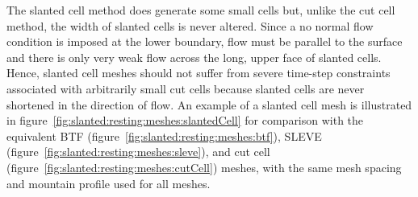 The slanted cell method does generate some small cells but, unlike the cut cell method, the width of slanted cells is never altered.
Since a no normal flow condition is imposed at the lower boundary, flow must be parallel to the surface and there is only very weak flow across the long, upper face of slanted cells.
Hence, slanted cell meshes should not suffer from severe time-step constraints associated with arbitrarily small cut cells because slanted cells are never shortened in the direction of flow.
An example of a slanted cell mesh is illustrated in figure~\ref{fig:slanted:resting:meshes:slantedCell} for comparison with the equivalent BTF (figure~\ref{fig:slanted:resting:meshes:btf}), SLEVE (figure~\ref{fig:slanted:resting:meshes:sleve}), and cut cell (figure~\ref{fig:slanted:resting:meshes:cutCell}) meshes, with the same mesh spacing and mountain profile used for all meshes.

